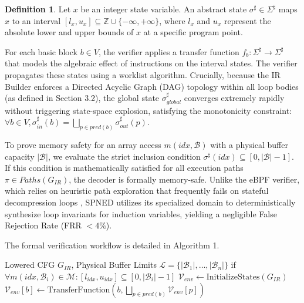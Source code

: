 \documentclass[onecolumn]{IEEEtran}
\numberwithin{equation}{section}
\theoremstyle{definition}
\newtheorem{definition}[theorem]{Definition}
\theoremstyle{remark}
\begin{document}
\begin{definition}
Let $x$ be an integer state variable. An abstract state $\sigma^\sharp \in \Sigma^\sharp$ maps $x$ to an interval $[l_x, u_x] \subseteq \mathbb{Z} \cup \{-\infty, +\infty\}$, where $l_x$ and $u_x$ represent the absolute lower and upper bounds of $x$ at a specific program point.
\end{definition}

For each basic block $b \in V$, the verifier applies a transfer function $f_b: \Sigma^\sharp \to \Sigma^\sharp$ that models the algebraic effect of instructions on the interval states. The verifier propagates these states using a worklist algorithm. Crucially, because the IR Builder enforces a Directed Acyclic Graph (DAG) topology within all loop bodies (as defined in Section 3.2), the global state $\sigma^\sharp_{global}$ converges extremely rapidly without triggering state-space explosion, satisfying the monotonicity constraint: $\forall b \in V, \sigma^\sharp_{in}(b) = \bigsqcup_{p \in pred(b)} \sigma^\sharp_{out}(p)$.

To prove memory safety for an array access $m(idx, \mathcal{B})$ with a physical buffer capacity $|\mathcal{B}|$, we evaluate the strict inclusion condition $\sigma^\sharp(idx) \subseteq [0, |\mathcal{B}|-1]$. If this condition is mathematically satisfied for all execution paths $\pi \in Paths(G_{IR})$, the decoder is formally memory-safe. Unlike the eBPF verifier, which relies on heuristic path exploration that frequently fails on stateful decompression loops \cite{hedam2023delilah, sun2024finding}, SPNED utilizes its specialized domain to deterministically synthesize loop invariants for induction variables, yielding a negligible False Rejection Rate (FRR $< 4\%$).

The formal verification workflow is detailed in Algorithm 1.

\begin{algorithm}
\caption{Interval-Based Static Verification}
\begin{algorithmic}[1]
\Require Lowered CFG $G_{IR}$, Physical Buffer Limits $\mathcal{L} = \{|\mathcal{B}_1|, \dots, |\mathcal{B}_n|\}$
\Ensure {} if $\forall m(idx, \mathcal{B}_i) \in \mathcal{M}: [l_{idx}, u_{idx}] \subseteq [0, |\mathcal{B}_i|-1]$
\State $\mathcal{V}_{env} \gets \text{InitializeStates}(G_{IR})$
        \State $\mathcal{V}_{env}[b] \gets \text{TransferFunction}(b, \bigsqcup_{p \in pred(b)} \mathcal{V}_{env}[p])$
    \EndFor
\EndWhile
{}
        \State \Return {} 
    \EndIf
\EndFor
\State \Return {} 
\end{algorithmic}
\end{algorithm}
\end{document}
